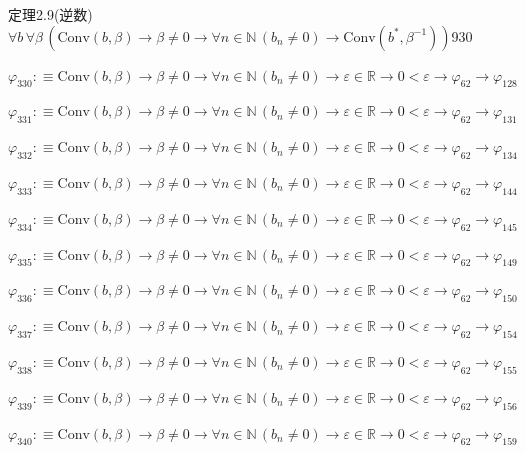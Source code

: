 \begin{fullproof}{定理2.9(逆数)}{$\forall b\,\forall \beta\,(\mathrm{Conv}(b,\beta) \to \beta \neq 0 \to \forall n \in \mathbb{N}\,(b_{n} \neq 0) \to \mathrm{Conv}(b^{\ast},\beta^{-1}))$}{930}
\begin{abbrevlist}
\item $\varphi_{330} :\equiv \mathrm{Conv}(b,\beta) \to \beta \neq 0 \to \forall n \in \mathbb{N}\,(b_{n} \neq 0) \to \varepsilon \in \mathbb{R} \to 0 < \varepsilon \to \varphi_{62} \to \varphi_{128}$
\item $\varphi_{331} :\equiv \mathrm{Conv}(b,\beta) \to \beta \neq 0 \to \forall n \in \mathbb{N}\,(b_{n} \neq 0) \to \varepsilon \in \mathbb{R} \to 0 < \varepsilon \to \varphi_{62} \to \varphi_{131}$
\item $\varphi_{332} :\equiv \mathrm{Conv}(b,\beta) \to \beta \neq 0 \to \forall n \in \mathbb{N}\,(b_{n} \neq 0) \to \varepsilon \in \mathbb{R} \to 0 < \varepsilon \to \varphi_{62} \to \varphi_{134}$
\item $\varphi_{333} :\equiv \mathrm{Conv}(b,\beta) \to \beta \neq 0 \to \forall n \in \mathbb{N}\,(b_{n} \neq 0) \to \varepsilon \in \mathbb{R} \to 0 < \varepsilon \to \varphi_{62} \to \varphi_{144}$
\item $\varphi_{334} :\equiv \mathrm{Conv}(b,\beta) \to \beta \neq 0 \to \forall n \in \mathbb{N}\,(b_{n} \neq 0) \to \varepsilon \in \mathbb{R} \to 0 < \varepsilon \to \varphi_{62} \to \varphi_{145}$
\item $\varphi_{335} :\equiv \mathrm{Conv}(b,\beta) \to \beta \neq 0 \to \forall n \in \mathbb{N}\,(b_{n} \neq 0) \to \varepsilon \in \mathbb{R} \to 0 < \varepsilon \to \varphi_{62} \to \varphi_{149}$
\item $\varphi_{336} :\equiv \mathrm{Conv}(b,\beta) \to \beta \neq 0 \to \forall n \in \mathbb{N}\,(b_{n} \neq 0) \to \varepsilon \in \mathbb{R} \to 0 < \varepsilon \to \varphi_{62} \to \varphi_{150}$
\item $\varphi_{337} :\equiv \mathrm{Conv}(b,\beta) \to \beta \neq 0 \to \forall n \in \mathbb{N}\,(b_{n} \neq 0) \to \varepsilon \in \mathbb{R} \to 0 < \varepsilon \to \varphi_{62} \to \varphi_{154}$
\item $\varphi_{338} :\equiv \mathrm{Conv}(b,\beta) \to \beta \neq 0 \to \forall n \in \mathbb{N}\,(b_{n} \neq 0) \to \varepsilon \in \mathbb{R} \to 0 < \varepsilon \to \varphi_{62} \to \varphi_{155}$
\item $\varphi_{339} :\equiv \mathrm{Conv}(b,\beta) \to \beta \neq 0 \to \forall n \in \mathbb{N}\,(b_{n} \neq 0) \to \varepsilon \in \mathbb{R} \to 0 < \varepsilon \to \varphi_{62} \to \varphi_{156}$
\item $\varphi_{340} :\equiv \mathrm{Conv}(b,\beta) \to \beta \neq 0 \to \forall n \in \mathbb{N}\,(b_{n} \neq 0) \to \varepsilon \in \mathbb{R} \to 0 < \varepsilon \to \varphi_{62} \to \varphi_{159}$

\end{abbrevlist}
\end{fullproof}
